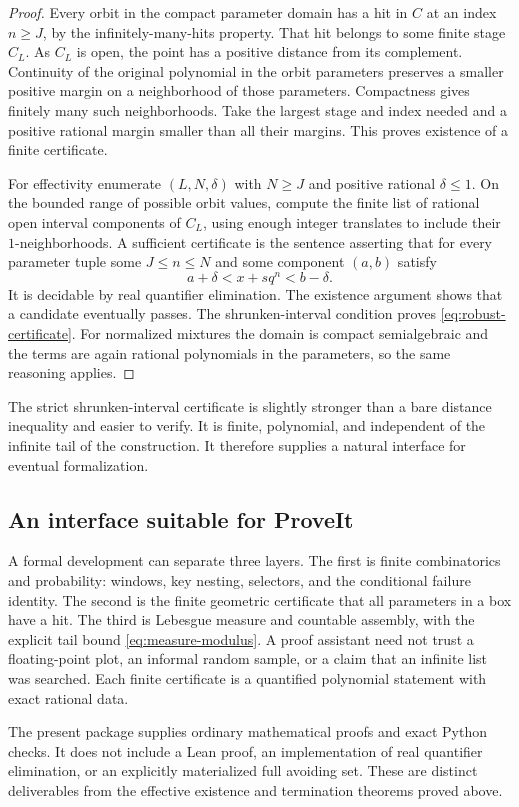 \begin{proof}
Every orbit in the compact parameter domain has a hit in $C$ at an
index $n\ge J$, by the infinitely-many-hits property. That hit
belongs to some finite stage $C_L$. As $C_L$ is open, the point has
a positive distance from its complement. Continuity of the original
polynomial in the orbit parameters preserves a smaller positive
margin on a neighborhood of those parameters. Compactness gives
finitely many such neighborhoods. Take the largest stage and index
needed and a positive rational margin smaller than all their margins.
This proves existence of a finite certificate.

For effectivity enumerate $(L,N,\delta)$ with $N\ge J$ and positive
rational $\delta\le1$. On the bounded range of possible orbit values,
compute the finite list of rational open interval components of $C_L$,
using enough integer translates to include their $1$-neighborhoods.
A sufficient certificate is the sentence asserting that for every
parameter tuple some $J\le n\le N$ and some component $(a,b)$ satisfy
\[
 a+\delta<x+sq^n<b-\delta.
\]
It is decidable by real quantifier elimination. The existence argument
shows that a candidate eventually passes. The shrunken-interval
condition proves \eqref{eq:robust-certificate}. For normalized
mixtures the domain is compact semialgebraic and the terms are again
rational polynomials in the parameters, so the same reasoning applies.
\end{proof}

The strict shrunken-interval certificate is slightly stronger than a
bare distance inequality and easier to verify. It is finite,
polynomial, and independent of the infinite tail of the construction.
It therefore supplies a natural interface for eventual formalization.

\subsection{An interface suitable for ProveIt}

A formal development can separate three layers. The first is finite
combinatorics and probability: windows, key nesting, selectors, and the
conditional failure identity. The second is the finite geometric
certificate that all parameters in a box have a hit. The third is
Lebesgue measure and countable assembly, with the explicit tail bound
\eqref{eq:measure-modulus}. A proof assistant need not trust a floating-point
plot, an informal random sample, or a claim that an infinite list was
searched. Each finite certificate is a quantified polynomial statement
with exact rational data.

The present package supplies ordinary mathematical proofs and exact
Python checks. It does not include a Lean proof, an implementation of
real quantifier elimination, or an explicitly materialized full avoiding
set. These are distinct deliverables from the effective existence and
termination theorems proved above.
